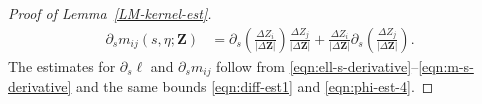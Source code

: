 \documentclass[11pt,reqno]{amsart}
\theoremstyle{plain}
\newtheorem{lemma}[theorem]{Lemma}
\theoremstyle{definition}
\numberwithin{equation}{section}
\newcommand{\paren}[1]{\left(#1\right)}
\newcommand{\p}{\partial}
\newcommand{\bm}[1]{\boldsymbol{#1}}
\newcommand{\abs}[1]{\left\lvert #1 \right\rvert}
\newcommand{\norm}[1]{\left\lVert #1 \right\rVert}
\newcommand{\ci}[1]{C^{#1}(I)}
\begin{document}
\begin{proof}[Proof of Lemma~\ref{LM-kernel-est}]
\begin{equation}\label{eqn:m-s-derivative}
\begin{aligned}
    \p_s m_{ij}(s,\eta;\bm Z) &= \p_s\paren{\frac{\Delta Z_i}{|\Delta\bm Z|}} \frac{\Delta Z_j}{|\Delta\bm Z|} + \frac{\Delta Z_i}{|\Delta\bm Z|}\p_s\paren{\frac{\Delta Z_j}{|\Delta\bm Z|}} .
\end{aligned}
\end{equation}
The estimates for $\p_s\ell$ and $\p_s m_{ij}$ follow from \eqref{eqn:ell-s-derivative}--\eqref{eqn:m-s-derivative} and the same bounds \eqref{eqn:diff-est1} and \eqref{eqn:phi-est-4}.
\end{proof}

\end{document}
